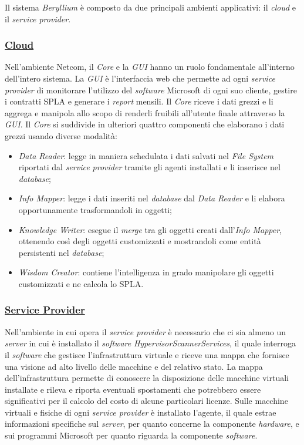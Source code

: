 Il sistema \emph{Beryllium} è composto da due principali ambienti applicativi: il \emph{cloud} e il \emph{service provider}.
\subsubsection{\underline{Cloud}}
Nell’ambiente Netcom, il \emph{Core} e la \emph{GUI} hanno un ruolo fondamentale all’interno dell’intero sistema.
La \emph{GUI} è l’interfaccia web che permette ad ogni \emph{service provider} di monitorare l'utilizzo del \emph{software} Microsoft di ogni suo cliente, gestire i contratti SPLA e generare i \emph{report} mensili.
Il \emph{Core} riceve i dati grezzi e li aggrega e manipola allo scopo di renderli fruibili all'utente finale attraverso la \emph{GUI}.
Il \emph{Core} si suddivide in ulteriori quattro componenti che elaborano i dati grezzi usando diverse modalità:
\begin{itemize}
    \item \emph{Data Reader}: legge in maniera schedulata i dati salvati nel \emph{File System} riportati dal \emph{service provider} tramite gli agenti installati e li inserisce nel \emph{database};
    \item \emph{Info Mapper}: legge i dati inseriti nel \emph{database} dal \emph{Data Reader} e li elabora opportunamente trasformandoli in oggetti;
    \item \emph{Knowledge Writer}: esegue il \emph{merge} tra gli oggetti creati dall’\emph{Info Mapper}, ottenendo così degli oggetti customizzati e mostrandoli come entità persistenti nel \emph{database}; 
    \item \emph{Wisdom Creator}: contiene l'intelligenza in grado manipolare gli oggetti customizzati e ne calcola lo SPLA.
\end{itemize}

\subsubsection{\underline{Service Provider}}

Nell’ambiente in cui opera il \emph{service provider} è necessario che ci sia almeno un \emph{server} in cui è installato il \emph{software} \emph{HypervisorScannerServices}, il quale interroga il \emph{software} che gestisce l’infrastruttura virtuale e riceve una mappa che fornisce una visione ad alto livello delle macchine e del relativo stato. La mappa dell’infrastruttura permette di conoscere la disposizione delle macchine virtuali installate e rileva e riporta eventuali spostamenti che potrebbero essere significativi per il calcolo del costo di alcune particolari licenze. Sulle macchine virtuali e fisiche di ogni \emph{service provider} è installato l’agente, il quale estrae informazioni specifiche sul \emph{server}, per quanto concerne la componente \emph{hardware}, e sui programmi Microsoft per quanto riguarda la componente \emph{software}.

